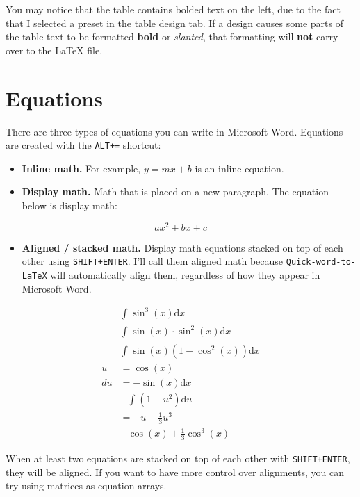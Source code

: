 \documentclass[12pt]{article}
\theoremstyle{plain}
\theoremstyle{remark}
\theoremstyle{definition}
\begin{document}
You may notice that the table contains bolded text on the left, due to
the fact that I selected a preset in the table design tab. If a design
causes some parts of the table text to be formatted \textbf{bold} or
\emph{slanted}, that formatting will \textbf{not} carry over to the
LaTeX file.


\section{Equations}

There are three types of equations you can write in Microsoft Word.
Equations are created with the \texttt{ALT+=} shortcut:

\begin{itemize}
\item
  \textbf{Inline math.} For example, \(y = mx + b\) is an inline
  equation.
\item
  \textbf{Display math.} Math that is placed on a new paragraph. The
  equation below is display math:
\end{itemize}

\[ax^{2} + bx + c\]

\begin{itemize}
\item
  \textbf{Aligned / stacked math.} Display math equations stacked on top
  of each other using \texttt{SHIFT+ENTER}. I'll call them aligned math
  because \texttt{Quick-word-to-LaTeX} will automatically align them,
  regardless of how they appear in Microsoft Word.
\end{itemize}

\begin{align*}
&\int_{}^{}{\sin^{3}(x)\text{d}x} \\
&\int_{}^{}{\sin(x) \cdot \sin^{2}(x)\text{d}x} \\
&\int_{}^{}{\sin(x)\left( 1 - \cos^{2}(x) \right)\text{d}x} \\
u &= \cos(x) \\
du &= - \sin(x)\text{d}x \\
&- \int_{}^{}{\left( 1 - u^{2} \right)\text{d}u} \\
&= - u + \frac{1}{3}u^{3} \\
&- \cos(x) + \frac{1}{3}\cos^{3}(x)
\end{align*}


When at least two equations are stacked on top of each other with
\texttt{SHIFT+ENTER}, they will be aligned. If you want to have more
control over alignments, you can try using matrices as equation arrays.
\end{document}
